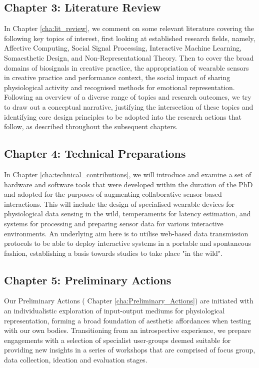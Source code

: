 \subsection{Chapter 3: Literature Review}

In Chapter \ref{cha:lit_review}, we comment on some relevant literature covering the following key topics of interest, first looking at established research fields, namely, Affective Computing, Social Signal Processing, Interactive Machine Learning, Somaesthetic Design, and Non-Representational Theory. Then to cover the broad domains of biosignals in creative practice, the appropriation of wearable sensors in creative practice and performance context, the social impact of sharing physiological activity and recognised methods for emotional representation. Following an overview of a diverse range of topics and research outcomes, we try to draw out a conceptual narrative, justifying the intersection of these topics and identifying core design principles to be adopted into the research actions that follow, as described throughout the subsequent chapters. 

\subsection{Chapter 4: Technical Preparations}

In Chapter \ref{cha:technical_contributions}, we will introduce and examine a set of hardware and software tools that were developed within the duration of the PhD and adopted for the purposes of augmenting collaborative sensor-based interactions. This will include the design of specialised wearable devices for physiological data sensing in the wild, temperaments for latency estimation, and systems for processing and preparing sensor data for various interactive environments. An underlying aim here is to utilise web-based data transmission protocols to be able to deploy interactive systems in a portable and spontaneous fashion, establishing a basis towards studies to take place "in the wild".

\subsection{Chapter 5: Preliminary Actions}

Our Preliminary Actions ( Chapter \ref{cha:Preliminary_Actions}) are initiated with an individualistic exploration of input-output mediums for physiological representation, forming a broad foundation of aesthetic affordances when testing with our own bodies. Transitioning from an introspective experience, we prepare engagements with a selection of specialist user-groups deemed suitable for providing new insights in a series of workshops that are comprised of focus group, data collection, ideation and evaluation stages.

